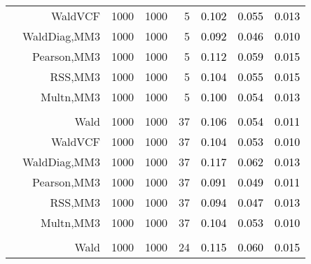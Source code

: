 \documentclass[
]{article}
\begin{document}
\begin{table}[H]
{\begin{tabular}[t]{lrrrrrrr}
\hspace{1em} & WaldVCF & 1000 & 1000 & 5 & \textcolor{black}{0.102} & \textcolor{black}{0.055} & \textcolor{black}{0.013}\\

\hspace{1em} & WaldDiag,MM3 & 1000 & 1000 & 5 & \textcolor{black}{0.092} & \textcolor{black}{0.046} & \textcolor{black}{0.010}\\

\hspace{1em} & Pearson,MM3 & 1000 & 1000 & 5 & \textcolor{black}{0.112} & \textcolor{black}{0.059} & \textcolor{black}{0.015}\\

\hspace{1em} & RSS,MM3 & 1000 & 1000 & 5 & \textcolor{black}{0.104} & \textcolor{black}{0.055} & \textcolor{black}{0.015}\\

\hspace{1em} & Multn,MM3 & 1000 & 1000 & 5 & \textcolor{black}{0.100} & \textcolor{black}{0.054} & \textcolor{black}{0.013}\\
\cmidrule{1-8}
\addlinespace[0.3em]
\multicolumn{8}{l}{\textbf{1F 15V}}\\
\hspace{1em} & Wald & 1000 & 1000 & 37 & \textcolor{black}{0.106} & \textcolor{black}{0.054} & \textcolor{black}{0.011}\\

\hspace{1em} & WaldVCF & 1000 & 1000 & 37 & \textcolor{black}{0.104} & \textcolor{black}{0.053} & \textcolor{black}{0.010}\\

\hspace{1em} & WaldDiag,MM3 & 1000 & 1000 & 37 & \textcolor{black}{0.117} & \textcolor{black}{0.062} & \textcolor{black}{0.013}\\

\hspace{1em} & Pearson,MM3 & 1000 & 1000 & 37 & \textcolor{black}{0.091} & \textcolor{black}{0.049} & \textcolor{black}{0.011}\\

\hspace{1em} & RSS,MM3 & 1000 & 1000 & 37 & \textcolor{black}{0.094} & \textcolor{black}{0.047} & \textcolor{black}{0.013}\\

\hspace{1em} & Multn,MM3 & 1000 & 1000 & 37 & \textcolor{black}{0.104} & \textcolor{black}{0.053} & \textcolor{black}{0.010}\\
\cmidrule{1-8}
\addlinespace[0.3em]
\multicolumn{8}{l}{\textbf{2F 10V}}\\
\hspace{1em} & Wald & 1000 & 1000 & 24 & \textcolor{black}{0.115} & \textcolor{black}{0.060} & \textcolor{black}{0.015}\\


\end{tabular}}
\end{table}
\end{document}
